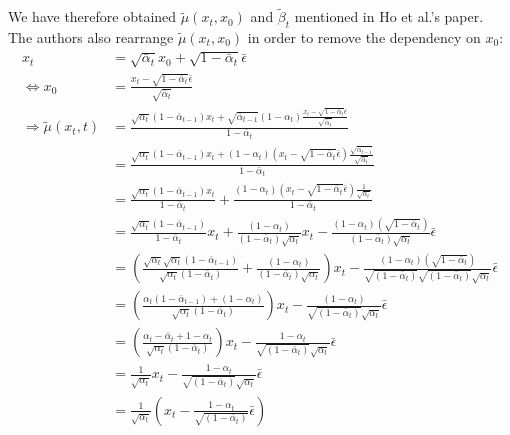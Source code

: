 \documentclass{article}
\begin{document}
{
\allowdisplaybreaks
  We have therefore obtained $\tilde{\mu}(x_t, x_0)$ and $\tilde{\beta}_t$ mentioned in Ho et al.'s \cite{ho2020denoising} paper. \\
  The authors also rearrange $\tilde{\mu}(x_t, x_0)$ in order to remove the dependency on $x_0$:
  \\
  \begin{align}
    x_t &= \sqrt{\bar{\alpha}_t} x_0 + \sqrt{1 - \bar{\alpha}_t} \bar{\epsilon} \\
    \Leftrightarrow x_0 &= \frac{x_t - \sqrt{1 - \bar{\alpha}_t} \bar{\epsilon}}{\sqrt{\bar{\alpha}_t}} \\
    \Rightarrow \tilde{\mu}(x_t, t) &= \frac{\sqrt{\alpha_t}(1 - \bar{\alpha}_{t-1}) x_t + \sqrt{\bar{\alpha}_{t-1}}(1 - \alpha_t) \frac{x_t - \sqrt{1 - \bar{\alpha}_t} \bar{\epsilon}}{\sqrt{\bar{\alpha}_t}}}{1 - \bar{\alpha}_t} \\
    &= \frac{\sqrt{\alpha_t}(1 - \bar{\alpha}_{t-1}) x_t + (1 - \alpha_t) \left(x_t - \sqrt{1 - \bar{\alpha}_t} \bar{\epsilon} \right) \frac{\sqrt{\bar{\alpha}_{t-1}}}{\sqrt{\bar{\alpha}_t}}}{1 - \bar{\alpha}_t} \\
    &= \frac{\sqrt{\alpha_t}(1 - \bar{\alpha}_{t-1}) x_t}{{1 - \bar{\alpha}_t}} + \frac{(1 - \alpha_t) \left(x_t - \sqrt{1 - \bar{\alpha}_t} \bar{\epsilon} \right) \frac{1}{\sqrt{\alpha_t}}}{1 - \bar{\alpha}_t} \\
    &= \frac{\sqrt{\alpha_t}(1 - \bar{\alpha}_{t-1})}{{1 - \bar{\alpha}_t}} x_t + \frac{(1 - \alpha_t)}{(1 - \bar{\alpha}_t) \sqrt{\alpha_t}} x_t - \frac{(1 - \alpha_t)(\sqrt{1 - \bar{\alpha}_t})}{(1 - \bar{\alpha}_t)\sqrt{\alpha_t}} \bar{\epsilon} \\
    &= \left( \frac{\sqrt{\alpha_t} \sqrt{\alpha_t}(1 - \bar{\alpha}_{t-1})}{\sqrt{\alpha_t} ({1 - \bar{\alpha}_t})}+ \frac{(1 - \alpha_t)}{(1 - \bar{\alpha}_t) \sqrt{\alpha_t}} \right) x_t - \frac{(1 - \alpha_t)(\sqrt{1 - \bar{\alpha}_t})}{\sqrt{(1 - \bar{\alpha}_t)}\sqrt{(1 - \bar{\alpha}_t)}\sqrt{\alpha_t}} \bar{\epsilon} \\
    &= \left( \frac{\alpha_t (1 - \bar{\alpha}_{t-1}) + (1 - \alpha_t)}{\sqrt{\alpha_t} ({1 - \bar{\alpha}_t})} \right) x_t - \frac{(1 - \alpha_t)}{\sqrt{(1 - \bar{\alpha}_t)}\sqrt{\alpha_t}} \bar{\epsilon} \\
    &= \left( \frac{\alpha_t - \bar{\alpha}_{t} + 1 - \alpha_t}{\sqrt{\alpha_t} ({1 - \bar{\alpha}_t})} \right) x_t - \frac{1 - \alpha_t}{\sqrt{(1 - \bar{\alpha}_t)}\sqrt{\alpha_t}} \bar{\epsilon} \\
    &= \frac{1}{\sqrt{\alpha_t}} x_t - \frac{1 - \alpha_t}{\sqrt{(1 - \bar{\alpha}_t)}\sqrt{\alpha_t}} \bar{\epsilon} \\
    &= \frac{1}{\sqrt{\alpha_t}} \left( x_t - \frac{1 - \alpha_t}{\sqrt{(1 - \bar{\alpha}_t)}} \bar{\epsilon} \right)
  \end{align}
}
\end{document}
